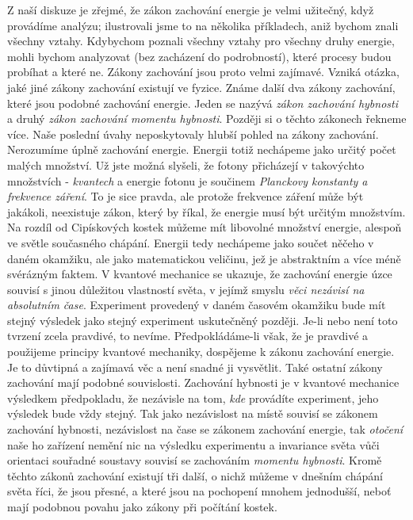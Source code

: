 {    Z naší diskuze je zřejmé, že zákon zachování energie je velmi užitečný, když provádíme analýzu; 
    ilustrovali jsme to na několika příkladech, aniž bychom znali všechny vztahy. Kdybychom poznali 
    všechny vztahy pro všechny druhy energie, mohli bychom analyzovat (bez zacházení do 
    podrobností), které procesy budou probíhat a které ne. Zákony zachování jsou proto velmi 
    zajímavé. Vzniká otázka, jaké jiné zákony zachování existují ve fyzice. Známe další dva zákony 
    zachování, které jsou podobné zachování energie. Jeden se nazývá \emph{zákon zachování 
    hybnosti} a druhý \emph{zákon zachování momentu hybnosti}. Později si o těchto zákonech řekneme 
    více. Naše poslední úvahy neposkytovaly hlubší pohled na zákony zachování. Nerozumíme úplně 
    zachování energie. Energii totiž nechápeme jako určitý počet malých množství. Už jste možná 
    slyšeli, že fotony přicházejí v takovýchto množstvích - \emph{kvantech} a energie fotonu je 
    součinem \emph{Planckovy konstanty a frekvence záření}. To je sice pravda, ale protože 
    frekvence záření může být jakákoli, neexistuje zákon, který by říkal, že energie musí být 
    určitým množstvím. Na rozdíl od Cipískových kostek můžeme mít libovolné množství energie, 
    alespoň ve světle současného chápání. Energii tedy nechápeme jako součet něčeho v daném 
    okamžiku, ale jako matematickou veličinu, jež je abstraktním a více méně svérázným faktem. V 
    kvantové mechanice se ukazuje, že zachování energie úzce souvisí s jinou důležitou vlastností 
    světa, v jejímž smyslu \emph{věci nezávisí na absolutním čase}. Experiment provedený v daném 
    časovém okamžiku bude mít stejný výsledek jako stejný experiment uskutečněný později. Je-li 
    nebo není toto tvrzení zcela pravdivé, to nevíme. Předpokládáme-li však, že je pravdivé a 
    použijeme principy kvantové mechaniky, dospějeme k zákonu zachování energie. Je to důvtipná a 
    zajímavá věc a není snadné ji vysvětlit. Také ostatní zákony zachování mají podobné 
    souvislosti. Zachování hybnosti je v kvantové mechanice výsledkem předpokladu, že nezávisle na 
    tom, \emph{kde} provádíte experiment, jeho výsledek bude vždy stejný. Tak jako nezávislost na 
    místě souvisí se zákonem zachování hybnosti, nezávislost na čase se zákonem zachování energie, 
    tak \emph{otočení} naše ho zařízení nemění nic na výsledku experimentu a invariance světa vůči 
    orientaci souřadné soustavy souvisí se zachováním \emph{momentu hybnosti}. Kromě těchto 
    zákonů zachování existují tři další, o nichž můžeme v dnešním chápání světa říci, že jsou 
    přesné, a které jsou na pochopení mnohem jednodušší, neboť mají podobnou povahu jako zákony při 
    počítání kostek.
    
}
